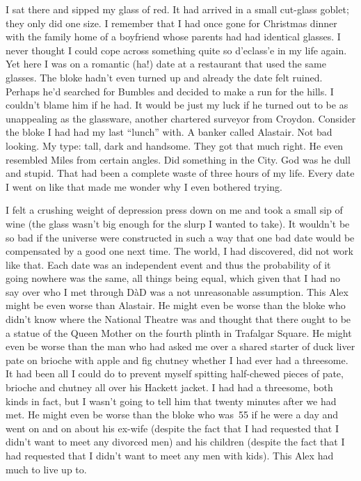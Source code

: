 I sat there and sipped my glass of red. It had arrived in a small
cut-glass goblet; they only did one size. I remember that I had once
gone for Christmas dinner with the family home of a boyfriend whose
parents had had identical glasses. I never thought I could cope
across something quite so d{'e}class{'e} in my life again. Yet here I
was on a romantic (ha!) date at a restaurant that used the same
glasses. The bloke hadn't even turned up and already the date felt
ruined. Perhaps
he'd searched for Bumbles and decided to make a run for the hills. I
couldn't blame him if he had. It would be just my luck if he turned out to be as
unappealing as the glassware, another chartered surveyor from
Croydon. Consider the bloke I had had my last ``lunch'' with.
A banker called Alastair. Not bad looking. My type: tall, dark and
handsome. They got that much right. He even resembled Miles from certain angles. Did something in the City. {\twelveit
God\/} was he dull and stupid. That had been a complete waste of
three hours of my life. Every date I went on like that made me wonder
why I even bothered trying.

I felt a crushing weight of depression press down on me and took a
small sip of wine (the glass wasn't big enough for the slurp I
wanted to take). It
wouldn't be so bad if the universe were constructed in such a way
that one bad date would be compensated by a good one next time. The
world, I had discovered, did not work like that. Each date was an independent event
and thus the probability of it going nowhere was the same, all
things being equal, which given that I had no say over who I met
through D{\`a}D was a not unreasonable assumption. This Alex might be even worse than Alastair. He might even be worse than the bloke who didn't know where the National Theatre
was and thought that there ought to be a statue of the Queen Mother on the fourth plinth in
Trafalgar Square. He might even be worse than the man who had asked me over a shared
starter of duck liver pate on brioche with apple and fig chutney
whether I had ever had a threesome. It had been all I could do to prevent
myself spitting half-chewed pieces of pate, brioche and chutney all
over his Hackett jacket. I had had a threesome, both kinds in fact, but I
wasn't going to tell him that twenty minutes after we had met. He might even be worse than the bloke who was~55 if he were a day and went on and on about his ex-wife (despite the fact that I had requested that I didn't
want to meet any divorced men) and his children (despite the fact
that I had requested that I didn't want to meet any men with kids).
This Alex had much to live up to.

